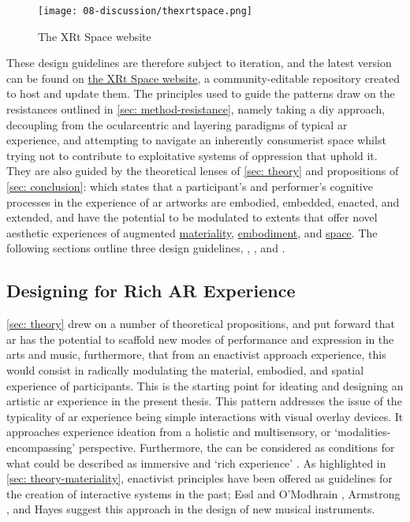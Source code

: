 \begin{figure}
    \centering
    {\texttt{[image: 08-discussion/thexrtspace.png]}}
    \caption[The XRt Space website]{The XRt Space website}
\end{figure}\label{fig: thexrtspace}

These design guidelines are therefore subject to iteration, and the latest version can be found on \href{https://sambilbow.github.io/thexrtspace}{the XRt Space website}, a community-editable repository created to host and update them. The principles used to guide the patterns draw on the resistances outlined in \autoref{sec: method-resistance}, namely taking a \gls{diy} approach, decoupling from the ocularcentric and layering paradigms of typical \gls{ar} experience, and attempting to navigate an inherently consumerist space whilst trying not to contribute to exploitative systems of oppression that uphold it. They are also guided by the theoretical lenses of \autoref{sec: theory} and propositions of \autoref{sec: conclusion}: which states that a participant's and performer's cognitive processes in the experience of \gls{ar} artworks are embodied, embedded, enacted, and extended, and have the potential to be modulated to extents that offer novel aesthetic experiences of augmented \hyperref[sec: discussion-medium-material]{materiality}, \hyperref[sec: discussion-medium-embodiment]{embodiment}, and \hyperref[sec: discussion-medium-space]{space}. The following sections outline three design guidelines, \textit{}, \textit{}, and \textit{}.

\subsection{Designing for Rich AR Experience}\label{sec: discussion-guidelines-experience} 
\autoref{sec: theory} drew on a number of theoretical propositions, and put forward that \gls{ar} has the potential to scaffold new modes of performance and expression in the arts and music, furthermore, that from an enactivist approach experience, this would consist in radically modulating the material, embodied, and spatial experience of participants. This is the starting point for ideating and designing an artistic \gls{ar} experience in the present thesis. This pattern addresses the issue of the typicality of \gls{ar} experience being simple interactions with visual overlay devices. It approaches experience ideation from a holistic and multisensory, or `modalities-encompassing' \citep{schraffenberger2018} perspective. Furthermore, the  can be considered as conditions for what could be described as immersive and `rich experience' \citep{bilbow2021}. As highlighted in \autoref{sec: theory-materiality}, enactivist principles have been offered as guidelines for the creation of interactive systems in the past; Essl and O'Modhrain \citeyearpar{essl2006}, Armstrong \citeyearpar{armstrong2006}, and Hayes \citeyearpar{hayes2019} suggest this approach in the design of new musical instruments. 

